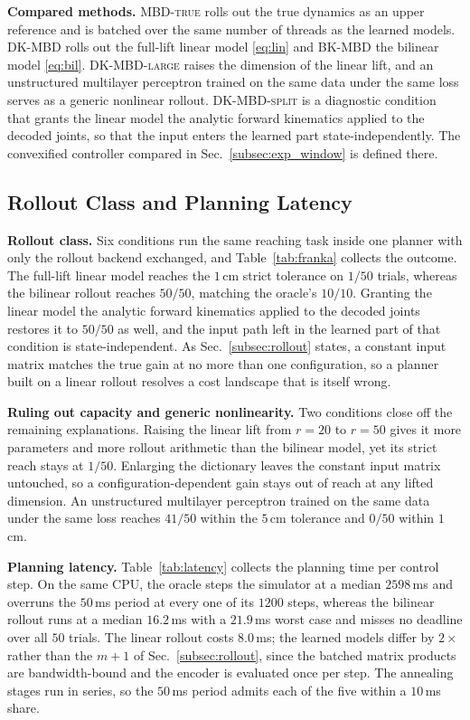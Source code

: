 \documentclass[letterpaper,10pt,conference]{ieeeconf}
\newcommand{\mbdtrue}{\textsc{MBD-true}}
\newcommand{\dkmbd}{\textsc{DK-MBD}}
\newcommand{\dksplit}{\textsc{DK-MBD-split}}
\newcommand{\bkmbd}{\textsc{BK-MBD}}
\begin{document}
\textbf{Compared methods.}
\mbdtrue{} rolls out the true dynamics as an upper reference and is batched over the same number of threads as the learned models.
\dkmbd{} rolls out the full-lift linear model \eqref{eq:lin} and \bkmbd{} the bilinear model \eqref{eq:bil}.
\textsc{DK-MBD-large} raises the dimension of the linear lift, and an unstructured multilayer perceptron trained on the same data under the same loss serves as a generic nonlinear rollout.
\dksplit{} is a diagnostic condition that grants the linear model the analytic forward kinematics applied to the decoded joints, so that the input enters the learned part state-independently.
The convexified controller compared in Sec.~\ref{subsec:exp_window} is defined there.
\subsection{Rollout Class and Planning Latency}\label{subsec:exp_franka}

\textbf{Rollout class.}
Six conditions run the same reaching task inside one planner with only the rollout backend exchanged, and Table~\ref{tab:franka} collects the outcome.
The full-lift linear model reaches the $1$\,cm strict tolerance on $1/50$ trials, whereas the bilinear rollout reaches $50/50$, matching the oracle's $10/10$.
Granting the linear model the analytic forward kinematics applied to the decoded joints restores it to $50/50$ as well, and the input path left in the learned part of that condition is state-independent.
As Sec.~\ref{subsec:rollout} states, a constant input matrix matches the true gain at no more than one configuration, so a planner built on a linear rollout resolves a cost landscape that is itself wrong.

\textbf{Ruling out capacity and generic nonlinearity.}
Two conditions close off the remaining explanations.
Raising the linear lift from $r=20$ to $r=50$ gives it more parameters and more rollout arithmetic than the bilinear model, yet its strict reach stays at $1/50$.
Enlarging the dictionary leaves the constant input matrix untouched, so a configuration-dependent gain stays out of reach at any lifted dimension.
An unstructured multilayer perceptron trained on the same data under the same loss reaches $41/50$ within the $5$\,cm tolerance and $0/50$ within $1$\,cm.

\textbf{Planning latency.}
Table~\ref{tab:latency} collects the planning time per control step.
On the same CPU, the oracle steps the simulator at a median $2598$\,ms and overruns the $50$\,ms period at every one of its $1200$ steps, whereas the bilinear rollout runs at a median $16.2$\,ms with a $21.9$\,ms worst case and misses no deadline over all $50$ trials.
The linear rollout costs $8.0$\,ms; the learned models differ by $2\times$ rather than the $m+1$ of Sec.~\ref{subsec:rollout}, since the batched matrix products are bandwidth-bound and the encoder is evaluated once per step.
The annealing stages run in series, so the $50$\,ms period admits each of the five within a $10$\,ms share.
\end{document}
